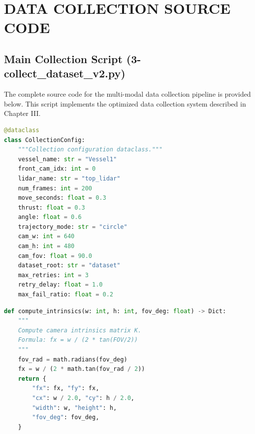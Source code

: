 
\section{DATA COLLECTION SOURCE CODE}

\subsection{Main Collection Script (3-collect\_dataset\_v2.py)}

The complete source code for the multi-modal data collection pipeline is provided below. This script implements the optimized data collection system described in Chapter III.

\begin{lstlisting}[language=Python, caption={Collection Configuration Class}]
@dataclass
class CollectionConfig:
    """Collection configuration dataclass."""
    vessel_name: str = "Vessel1"
    front_cam_idx: int = 0
    lidar_name: str = "top_lidar"
    num_frames: int = 200
    move_seconds: float = 0.3
    thrust: float = 0.3
    angle: float = 0.6
    trajectory_mode: str = "circle"
    cam_w: int = 640
    cam_h: int = 480
    cam_fov: float = 90.0
    dataset_root: str = "dataset"
    max_retries: int = 3
    retry_delay: float = 1.0
    max_fail_ratio: float = 0.2
\end{lstlisting}

\begin{lstlisting}[language=Python, caption={Camera Intrinsics Computation}]
def compute_intrinsics(w: int, h: int, fov_deg: float) -> Dict:
    """
    Compute camera intrinsics matrix K.
    Formula: fx = w / (2 * tan(FOV/2))
    """
    fov_rad = math.radians(fov_deg)
    fx = w / (2 * math.tan(fov_rad / 2))
    return {
        "fx": fx, "fy": fx,
        "cx": w / 2.0, "cy": h / 2.0,
        "width": w, "height": h,
        "fov_deg": fov_deg,
    }
\end{lstlisting}


